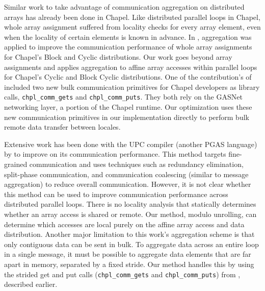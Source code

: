 Similar work to take advantage of communication aggregation on distributed arrays has already been done in Chapel. Like distributed parallel loops in Chapel, whole array assignment suffered from locality checks for every array element, even when the locality of certain elements is known in advance. In \cite{sanz2012global}, aggregation was applied to improve the communication performance of whole array assignments for Chapel's Block and Cyclic distributions. Our work goes beyond array assignments and applies aggregation to affine array accesses within parallel loops for Chapel's Cyclic and Block Cyclic distributions. One of the contribution's of \cite{sanz2012global} included two new bulk communication primitives for Chapel developers as library calls, \texttt{chpl\_comm\_gets} and \texttt{chpl\_comm\_puts}. They both rely on the GASNet networking layer, a portion of the Chapel runtime.  Our optimization uses these new communication primitives in our implementation directly to perform bulk remote data transfer between locales.

Extensive work has been done with the UPC compiler (another PGAS language) by \cite{chen2005communication} to improve on its communication performance. This method targets fine-grained communication and uses techniques such as redundancy elimination, split-phase communication, and communication coalescing (similar to message aggregation) to reduce overall communication. However, it is not clear whether this method can be used to improve communication performance across distributed parallel loops. There is no locality analysis that statically determines whether an array access is shared or remote. Our method, modulo unrolling, can determine which accesses are local purely on the affine array access and data distribution. Another major limitation to this work's aggregation scheme is that only contiguous data can be sent in bulk. To aggregate data across an entire loop in a single message, it must be possible to aggregate data elements that are far apart in memory, separated by a fixed stride. Our method handles this by using the strided get and put calls (\texttt{chpl\_comm\_gets} and \texttt{chpl\_comm\_puts}) from \cite{sanz2012global}, described earlier. 

\begin{comment}
\cite{callahan1988compiling}
\cite{chamberlain1998zpl}
\cite{chamberlain1997factor}
\cite{chavarria2005effective}
\cite{davidson1995improving}
\cite{Dion96compilingaffine}
\cite{germain1995automatic}
\cite{Gupta91automaticdata}
\cite{gupta1996compiling}
\cite{huang1994speculative}
\cite{iancu2008performance}
\cite{li1991data}
\cite{pouchet2011loop}
\cite{ramanujam1991compile}
\cite{shih2000efficient}
\cite{trifunovic2010graphite}
\cite{wei1998compiling}
\cite{chamberlain2011user}
\cite{bonachea2007proposal}
\cite{sanz2012global}
\end{comment}